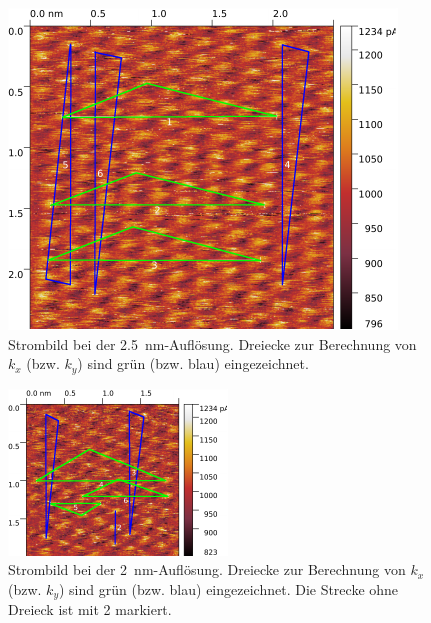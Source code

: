 \begin{figure}[H]
\centering
\includegraphics[width=\textwidth]{../Gwyddion/HOPG/2,5nm_gimped.pdf}
\caption{Strombild bei der \SI{2,5}{nm}-Auflösung. Dreiecke zur Berechnung von $k_x$ (bzw. $k_y$) sind grün (bzw. blau) eingezeichnet.}
\label{2,5nm}
\end{figure}

\begin{figure}[H]
\centering
\includegraphics[width=\textwidth]{../Gwyddion/HOPG/2nm_gimped.pdf}
\caption{Strombild bei der \SI{2}{nm}-Auflösung. Dreiecke zur Berechnung von $k_x$ (bzw. $k_y$) sind grün (bzw. blau) eingezeichnet. Die Strecke ohne Dreieck ist mit 2 markiert.}
\label{2nm}
\end{figure}

